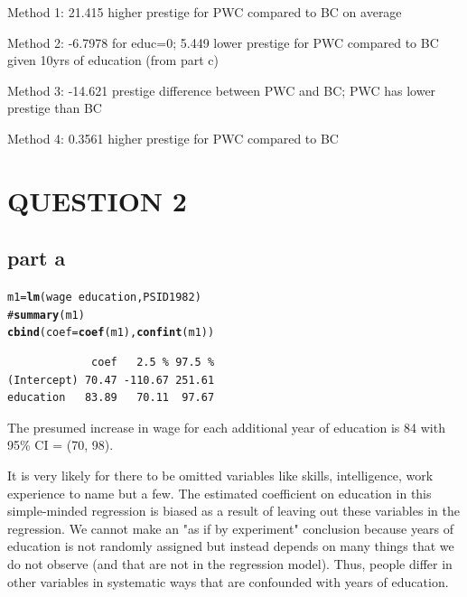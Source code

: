 \documentclass{article}\usepackage{graphicx, color}
\makeatletter
\newcommand{\hlfunctioncall}[1]{\textcolor[rgb]{0.501960784313725,0,0.329411764705882}{\textbf{#1}}}%
\newcommand{\hlcomment}[1]{\textcolor[rgb]{0.180392156862745,0.6,0.341176470588235}{#1}}%
\newenvironment{kframe}{%
 \def\at@end@of@kframe{}%
 \ifinner\ifhmode%
  \def\at@end@of@kframe{\end{minipage}}%
  \begin{minipage}{\columnwidth}%
 \fi\fi%
 \def\FrameCommand##1{\hskip\@totalleftmargin \hskip-\fboxsep
 \colorbox{shadecolor}{##1}\hskip-\fboxsep
     \hskip-\linewidth \hskip-\@totalleftmargin \hskip\columnwidth}%
 \MakeFramed {\advance\hsize-\width
   \@totalleftmargin\z@ \linewidth\hsize
   \@setminipage}}%
 {\par\unskip\endMakeFramed%
 \at@end@of@kframe}
\newenvironment{knitrout}{}{} %
\makeatother
\begin{document}
Method 1: 21.415 higher prestige for PWC compared to BC on average

Method 2: -6.7978 for educ=0; 5.449 lower prestige for PWC compared to BC given 10yrs of education (from part c)

Method 3: -14.621 prestige difference between PWC and BC; PWC has lower prestige than BC

Method 4: 0.3561 higher prestige for PWC compared to BC

\newpage
\section*{QUESTION 2}


\subsection*{part a}
\begin{knitrout}
\color{fgcolor}\begin{kframe}
\begin{alltt}
m1=\hlfunctioncall{lm}(wage~education, PSID1982)
\hlcomment{#\hlfunctioncall{summary}(m1)}
\hlfunctioncall{cbind}(coef=\hlfunctioncall{coef}(m1),\hlfunctioncall{confint}(m1))
\end{alltt}
\begin{verbatim}
             coef   2.5 % 97.5 %
(Intercept) 70.47 -110.67 251.61
education   83.89   70.11  97.67
\end{verbatim}
\end{kframe}
\end{knitrout}

The presumed increase in wage for each additional year of education is 84  with 95\% CI = (70, 98). 

It is very likely for there to be omitted variables like skills, intelligence, work experience to name but a few. The estimated coefficient on education in this simple-minded regression is biased as a result of leaving out these variables in the regression. 
We cannot make an "as if by experiment" conclusion because years of education is not randomly assigned but instead depends on many things that we do not observe (and that are not in the regression model). Thus, people differ in other variables in systematic ways that are confounded with years of education.
\end{document}
